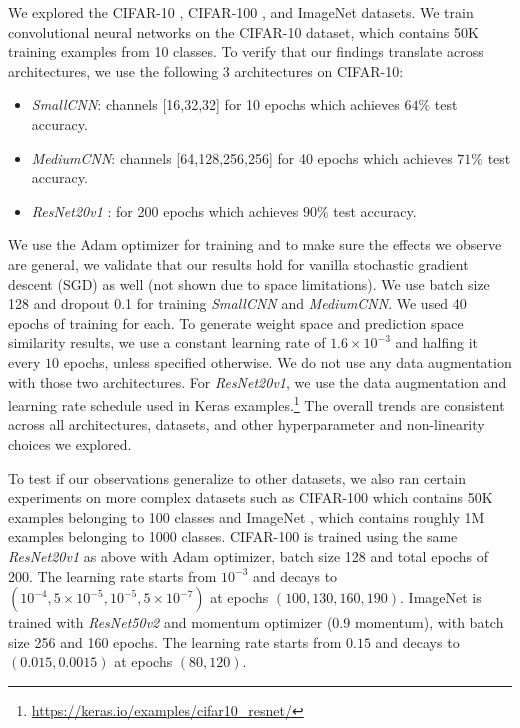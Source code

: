 \documentclass{article}
\begin{document}
%
We explored the CIFAR-10 \citep{cifar10}, CIFAR-100 \citep{cifar10}, and ImageNet \citep{imagenet_cvpr09} datasets. We train convolutional neural networks on the CIFAR-10 dataset, which contains 50K training examples from 10 classes. To verify that our findings translate across architectures,  we use the following 3 architectures on CIFAR-10: %
\begin{itemize}\itemsep0em
    \item \emph{SmallCNN}: channels [16,32,32]
 for 10 epochs which achieves $64\%$ test accuracy.
     \item \emph{MediumCNN}: channels [64,128,256,256]
 for 40 epochs which achieves $71\%$ test accuracy.
    \item \emph{ResNet20v1} \citep{resnet}:
 for 200 epochs which achieves $90\%$ test accuracy.
\end{itemize}
%
We use the Adam optimizer \citep{adam} for training and to make sure the effects we observe are general, we validate that our results hold for vanilla stochastic gradient descent (SGD) as well (not shown due to space limitations). We use batch size 128 and dropout 0.1 for training  \emph{SmallCNN} and \emph{MediumCNN}. We used 40 epochs of training for each.
To generate weight space and prediction space similarity results, we use a constant learning rate of $1.6 \times 10^{-3}$ and halfing it every $10$ epochs, unless specified otherwise. We do not use any data augmentation with those two architectures. For \emph{ResNet20v1}, we use the data augmentation and learning rate schedule used in Keras examples.\footnote{\url{https://keras.io/examples/cifar10_resnet/}} The overall trends are consistent across all architectures, datasets, and other hyperparameter and non-linearity choices we explored.


To test if our observations generalize to other datasets, we also ran certain experiments on more complex datasets such as CIFAR-100 \citep{cifar10} which contains 50K examples belonging to 100 classes and ImageNet \citep{imagenet_cvpr09}, which contains roughly 1M examples belonging to 1000 classes. 
%
%
CIFAR-100 is trained using the same \emph{ResNet20v1} as above with Adam optimizer, batch size 128 and total epochs of 200. The learning rate starts from $10^{-3}$ and decays to $(10^{-4}, 5\times10^{-5},10^{-5},5\times10^{-7})$ at epochs $(100, 130, 160, 190)$. ImageNet is trained with \emph{ResNet50v2} %
\citep{he2016identity} and momentum optimizer ($0.9$ momentum), with batch size 256 and 160 epochs. The learning rate starts from $0.15$ and decays to $(0.015, 0.0015)$ at epochs $(80, 120)$.
\end{document}
